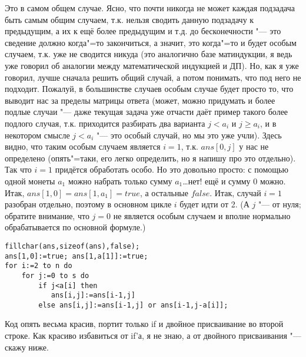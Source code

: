 Это в самом общем случае. Ясно, что почти никогда не может каждая подзадача быть самым общим 
случаем, т.к. нельзя сводить данную подзадачу к предыдущим, а их к ещё более предыдущим и т.д. до 
бесконечности "--- это сведение должно когда"=то закончиться, а значит, это когда"=то и будет 
особым случаем, т.к. уже не сводится никуда (это аналогично базе матиндукции, я ведь уже говорил об 
аналогии между математической индукцией и ДП). Но, как я уже говорил, лучше сначала решить общий 
случай, а потом понимать, что под него не подходит. Пожалуй, в большинстве случаев особым случае 
будет просто то, что выводит нас за пределы матрицы ответа {\footnotesize (может, можно придумать и более подлые 
случаи "--- даже текущая задача уже отчасти даёт пример такого более подлого случая, т.к. приходится 
разбирать два варианта $j<a_i$ и $j\geq a_i$, и в некотором смысле $j<a_i$ "--- это особый случай, 
но мы это уже учли)}. Здесь видно, что таким особым случаем является $i=1$, т.к. $ans[0,j]$ у нас 
не определено (опять"=таки, его легко определить, но я напишу про это отдельно). Так что $i=1$ 
придётся обработать особо. Но это довольно просто: с помощью одной монеты $a_1$ можно набрать 
только сумму $a_1$\dots нет! ещё и сумму 0 можно. Итак, $ans[1,0]=ans[1,a_1]=true$, а остальные 
$false$. Итак, случай $i=1$ разобран отдельно, поэтому в основном цикле $i$ будет идти от 2. (А $j$ 
"--- от нуля; обратите внимание, что $j=0$ не является особым случаем и вполне нормально 
обрабатывается по основной формуле.)
\begin{codesampleo}\begin{verbatim}
fillchar(ans,sizeof(ans),false);
ans[1,0]:=true; ans[1,a[1]]:=true;
for i:=2 to n do
    for j:=0 to s do
        if j<a[i] then
           ans[i,j]:=ans[i-1,j]
        else ans[i,j]:=ans[i-1,j] or ans[i-1,j-a[i]];
\end{verbatim}
\end{codesampleo}
Код опять весьма красив, портит только if и двойное присваивание во второй строке. Как красиво избавиться 
от if'а, я не знаю, а от двойного присваивания "--- скажу ниже.

